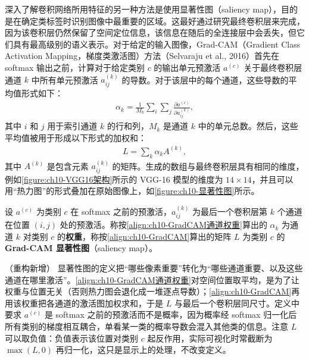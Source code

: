 \documentclass[../../main.tex]{subfiles}
\begin{document}
深入了解卷积网络所用特征的另一种方法是使用显著性图（saliency map），目的是在确定类标签时识别图像中最重要的区域。这最好通过研究最终卷积层来完成，因为该卷积层仍然保留了空间定位信息，该信息在随后的全连接层中会丢失，但它们具有最高级别的语义表示。对于给定的输入图像，Grad-CAM（Gradient Class Activation Mapping，梯度类激活图）方法（Selvaraju et al., 2016）首先在 softmax 输出之前，计算对于给定类别 $c$ 的输出单元预激活 $a^{(c)}$ 关于最终卷积层通道 $k$ 中所有单元预激活 $a_{ij}^{(k)}$ 的导数。对于该层中的每个通道，这些导数的平均值形式如下：
\begin{align}
  \alpha_k = \frac{1}{M_k}\sum_{i}\sum_{j}\frac{\partial a^{(c)}}{\partial a_{ij}^{(k)}},
  \label{align:ch10-GradCAM通道权重}
\end{align}
其中 $i$ 和 $j$ 用于索引通道 $k$ 的行和列，$M_k$ 是通道 $k$ 中的单元总数。然后，这些平均值被用于形成以下形式的加权和：
\begin{align}
  L = \sum_{k}\alpha_k A^{(k)},
  \label{align:ch10-GradCAM}
\end{align}
其中 $A^{(k)}$ 是包含元素 $a_{ij}^{(k)}$ 的矩阵。生成的数组与最终卷积层具有相同的维度，例如\cref{figure:ch10-VGG16架构}所示的 VGG-16 模型的维度为 $14\times 14$，并且可以用“热力图”的形式叠加在原始图像上，如\cref{figure:ch10-显著性图}所示。

\begin{definition}\label{definition:ch10-显著性图}
设 $a^{(c)}$ 为类别 $c$ 在 softmax 之前的预激活，$a_{ij}^{(k)}$ 为最后一个卷积层第 $k$ 个通道在位置 $(i,j)$ 处的预激活。称按\eqref{align:ch10-GradCAM通道权重}算出的 $\alpha_k$ 为通道 $k$ 对类别 $c$ 的\textbf{权重}，称按\eqref{align:ch10-GradCAM}算出的矩阵 $L$ 为类别 $c$ 的 \textbf{Grad-CAM 显著性图}（saliency map）。
\end{definition}

\begin{remark}（重构新增）
显著性图的定义把“哪些像素重要”转化为“哪些通道重要、以及这些通道在哪里激活”。\eqref{align:ch10-GradCAM通道权重}对空间位置取平均，是为了让权重与位置无关（否则热力图会退化成一堆逐点导数）；\eqref{align:ch10-GradCAM}再用该权重把各通道的激活图加权求和，于是 $L$ 与最后一个卷积层同尺寸。定义中要求 $a^{(c)}$ 是 softmax 之前的预激活而不是概率，因为概率经 softmax 归一化后所有类别的梯度相互耦合，单看某一类的概率导数会混入其他类的信息。注意 $L$ 可以取负值：负值表示该位置对类别 $c$ 起反作用，实际可视化时常截断为 $\max(L,0)$ 再归一化，这只是显示上的处理，不改变定义。
\end{remark}
\end{document}
